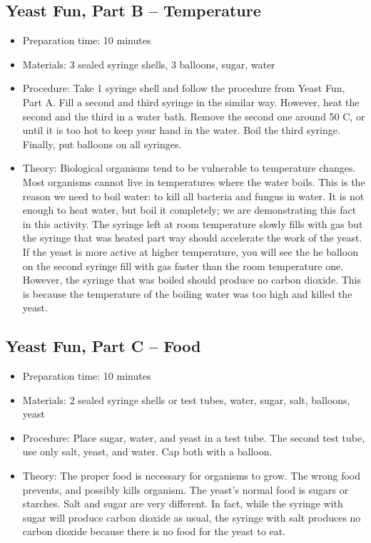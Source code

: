 \subsection{Yeast Fun, Part B -- Temperature}
\begin{itemize}
\item{Preparation time: 10 minutes}
\item{Materials: 3 sealed syringe shells, 3 balloons, sugar, water}
\item{Procedure: Take 1 syringe shell and follow the procedure from Yeast Fun, Part A. Fill a second and third syringe in the similar way. However, heat the second and the third in a water bath. Remove the second one around 50 C, or until it is too hot to keep your hand in the water. Boil the third syringe. Finally, put balloons on all syringes.}
\item{Theory: Biological organisms tend to be vulnerable to temperature changes. Most organisms cannot live in temperatures where the water boils. This is the reason we need to boil water: to kill all bacteria and fungus in water. It is not enough to heat water, but boil it completely; we are demonstrating this fact in this activity. The syringe left at room temperature slowly fills with gas but the syringe that was heated part way should accelerate the work of the yeast. If the yeast is more active at higher temperature, you will see the he balloon on the second syringe fill with gas faster than the room temperature one. However, the syringe that was boiled should produce no carbon dioxide. This is because the temperature of the boiling water was too high and killed the yeast.}
\end{itemize}


\subsection{Yeast Fun, Part C -- Food}
\begin{itemize}
\item{Preparation time: 10 minutes}
\item{Materials: 2 sealed syringe shells or test tubes, water, sugar, salt, balloons, yeast}
\item{Procedure: Place sugar, water, and yeast in a test tube. The second test tube, use only salt, yeast, and water. Cap both with a balloon.}
\item{Theory: The proper food is necessary for organisms to grow. The wrong food prevents, and possibly kills organism. The yeast’s normal food is sugars or starches. Salt and sugar are very different. In fact, while the syringe with sugar will produce carbon dioxide as usual, the syringe with salt produces no carbon dioxide because there is no food for the yeast to eat.}
\end{itemize}


